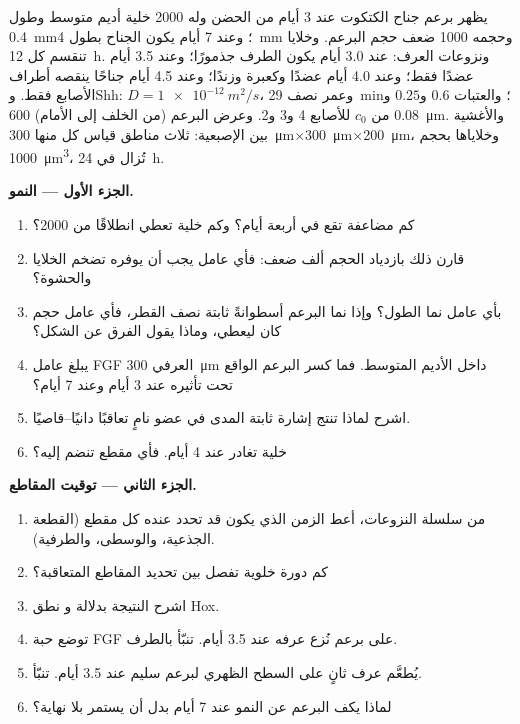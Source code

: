 \begin{problem}
\label{pb:b2:limb-organogenesis:1}
يظهر برعم جناح الكتكوت عند 3 أيام من الحضن وله \num{2000}
خلية أديم متوسط وطول \qty{0.4}{mm}؛ وعند 7 أيام يكون الجناح
بطول \qty{4}{mm} وحجمه \num{1000} ضعف حجم البرعم. وخلايا  تنقسم كل \qty{12}{h}. ونزوعات العرف: عند 3.0 أيام يكون
الطرف جذمورًا؛ وعند 3.5 أيام عضدًا فقط؛ وعند 4.0 أيام عضدًا
وكعبرة وزندًا؛ وعند 4.5 أيام جناحًا ينقصه أطراف الأصابع فقط.
وShh: $D = \qty{1e-12}{m^2/s}$، وعمر نصف \qty{29}{min}؛ والعتبات
$0.6$ و$0.25$ و$0.08$ من $c_0$ للأصابع 4 و3 و2. وعرض البرعم (من الخلف
إلى الأمام) \qty{600}{\micro m}. والأغشية بين الإصبعية: ثلاث مناطق
قياس كل منها \qty{300}{\micro m}$\times$\qty{300}{\micro m}$\times$\qty{200}{\micro m}، وخلاياها
بحجم \qty{1000}{\micro m^3}، تُزال في \qty{24}{h}.

\medskip
\noindent\textbf{الجزء الأول --- النمو.}
\begin{enumerate}
  \item كم مضاعفة تقع في أربعة أيام؟ وكم خلية تعطي
        انطلاقًا من \num{2000}؟
  \item قارن ذلك بازدياد الحجم ألف ضعف: فأي عامل
        يجب أن يوفره تضخم الخلايا والحشوة؟
  \item بأي عامل نما الطول؟ وإذا نما البرعم أسطوانةً
        ثابتة نصف القطر، فأي عامل حجم كان ليعطي، وماذا
        يقول الفرق عن الشكل؟
  \item يبلغ عامل FGF العرفي \qty{300}{\micro m} داخل الأديم المتوسط.
        فما كسر البرعم الواقع تحت تأثيره عند 3 أيام
        وعند 7 أيام؟
  \item اشرح لماذا تنتج إشارة ثابتة المدى في عضو نامٍ
        تعاقبًا دانيًا--قاصيًا.
  \item خلية تغادر  عند 4 أيام. فأي مقطع
        تنضم إليه؟
\end{enumerate}

\medskip
\noindent\textbf{الجزء الثاني --- توقيت المقاطع.}
\begin{enumerate}[resume]
  \item من سلسلة النزوعات، أعط الزمن الذي يكون قد تحدد عنده كل
        مقطع (القطعة الجذعية، والوسطى، والطرفية).
  \item كم دورة خلوية تفصل بين تحديد
        المقاطع المتعاقبة؟
  \item اشرح النتيجة بدلالة  و
        نطق Hox.
  \item توضع حبة FGF على برعم نُزع عرفه عند 3.5
        أيام. تنبّأ بالطرف.
  \item يُطعَّم عرف ثانٍ على السطح الظهري لبرعم
        سليم عند 3.5 أيام. تنبّأ.
  \item لماذا يكف البرعم عن النمو عند 7 أيام بدل أن
        يستمر بلا نهاية؟
\end{enumerate}


\end{problem}
